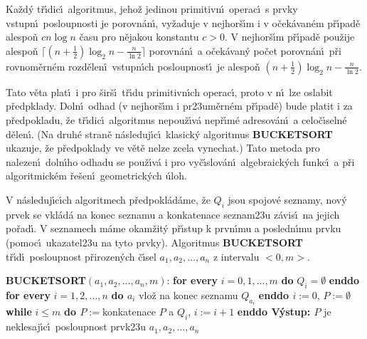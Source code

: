 Ka\v zd\'y t\v r\'\i dic\'\i\ algoritmus, jeho\v z jedinou 
primitivn\'\i\ ope\-rac\'\i\ s prvky vstupn\'\i\ posloupnosti je 
porovn\'an\'\i , vy\v zaduje v nejhor\v s\'\i m i v o\v cek\'avan\'em p\v r\'\i pad\v e 
alespo\v n $cn\log n$ \v casu pro n\v ejakou konstantu $c>0$.  V 
nejhor\v s\'\i m p\v r\'\i pad\v e pou\v zije alespo\v n $\lceil 
(n+\frac 12)\log_2n-\frac n{\ln2}\rceil$ 
porovn\'an\'\i\ a o\v cek\'avan\'y po\v cet porovn\'an\'\i\ p\v ri rovnom\v ern\'em 
rozd\v elen\'\i\ vstupn\'\i ch posloupnost\'\i\ je alespo\v n 
$(n+\frac 12)\log_2n-\frac n{\ln2}$.  
\endproclaim
\medskip

\flushpar Tato v\v eta 
plat\'\i\ i pro \v sir\v s\'\i\ t\v r\'\i du primitivn\'\i ch operac\'\i , proto v n\'\i\ 
lze oslabit p\v redpklady. 
Doln\'\i\ odhad (v nejhor\v s\'\i m i pr\accent23um\v ern\'em p\v r\'\i pad\v e) 
bude platit i za 
p\v red\-pokladu, \v ze t\v r\'\i dic\'\i\ algoritmus nepou\v z\'\i v\'a nep\v r\'\i m\'e 
adreso\-v\'an\'\i\ a celo\-\v c\'\i seln\'e d\v elen\'\i . 
(Na druh\'e stran\v e n\'asleduj\'\i c\'\i\ klasick\'y algoritmus 
{\bf BUCKETSORT} ukazuje, \v ze p\v red\-poklady
ve v\v et\v e nelze zcela vynechat.) 
Tato metoda pro 
nalezen\'\i\ doln\'\i ho odhadu se pou\v z\'\i v\'a i pro vy\v c\'\i slov\'an\'\i\ 
algebraick\'ych funkc\'\i\ a p\v ri algoritmick\'em \v re\v sen\'\i\ 
geometrick\'ych \'uloh.
\bigskip

\centerline{}
\bigskip


\flushpar V n\'asleduj\'\i c\'\i ch algoritmech 
p\v red\-po\-kl\'a\-d\'ame, \v ze $Q_i$ jsou spojov\'e seznamy, nov\'y 
prvek se vkl\'ad\'a na konec seznamu a konkatenace 
seznam\accent23u z\'avis\'\i\ na jejich po\v rad\'\i . V 
seznamech m\'ame okam\v zit\'y p\v r\'\i stup k prvn\'\i mu a posledn\'\i mu 
prvku (pomoc\'\i\ ukazatel\accent23u na tyto prvky). 
Algoritmus {\bf BUCKETSORT} t\v r\'\i d\'\i\ posloupnost p\v rirozen\'ych 
\v c\'\i sel $a_1,a_2,\dots,a_n$ z intervalu $<0,m>$.
\bigskip

{\bf BUCKETSORT$(a_1,a_2,\dots,a_n,m)$}:\newline 
{\bf for every} $i=0,1,\dots,m$ {\bf do} $Q_i=\emptyset$ {\bf enddo\newline 
for every} $i=1,2,\dots,n$ {\bf do\newline 
\phantom{{\rm ---}}$a_i$} vlo\v z na konec seznamu $Q_{a_i}$\newline 
{\bf enddo\newline 
$i:=0$}, $P:=\emptyset$\newline 
{\bf while} $i\le m$ {\bf do\newline 
\phantom{{\rm ---}}$P:=$}konkatenace $P$ a $Q_i$, $i:=i+1$\newline 
{\bf enddo\newline 
V\'ystup: $P$} je neklesaj\'\i c\'\i\ posloupnost prvk\accent23u 
$a_1,a_2,\dots,a_n$
\bigskip

